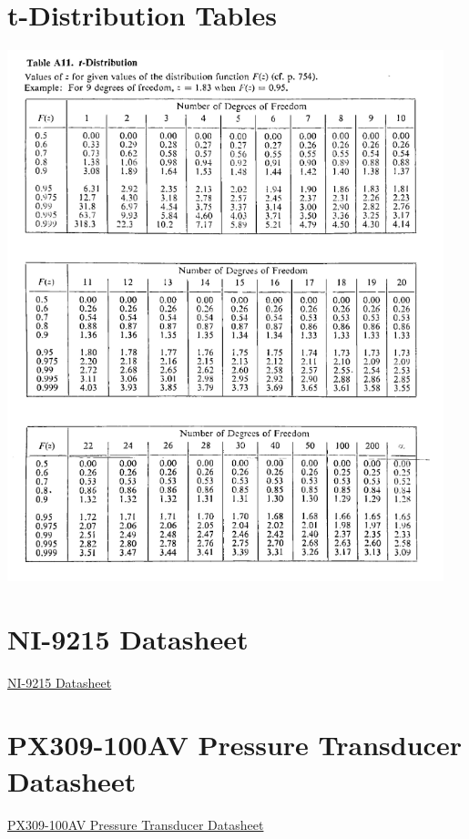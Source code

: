 \documentclass{article}
\begin{document}
\newpage
\begin{appendices}
\pagestyle{fancy}
\renewcommand{\thefigure}{A\arabic{figure}}
\setcounter{figure}{0}

\section*{t-Distribution Tables}
\hypertarget{1}{\includegraphics[width=0.95\textwidth]{t_distribution_Table_lecture3.png}}

\section*{NI-9215 Datasheet}
\href{https://www.amc-systeme.de/files/pdf/ni-9215-amc.pdf}{NI-9215 Datasheet}

\section*{PX309-100AV Pressure Transducer Datasheet}
\href{https://www.farnell.com/datasheets/2339490.pdf}{PX309-100AV Pressure Transducer Datasheet}
\end{appendices}
\end{document}
